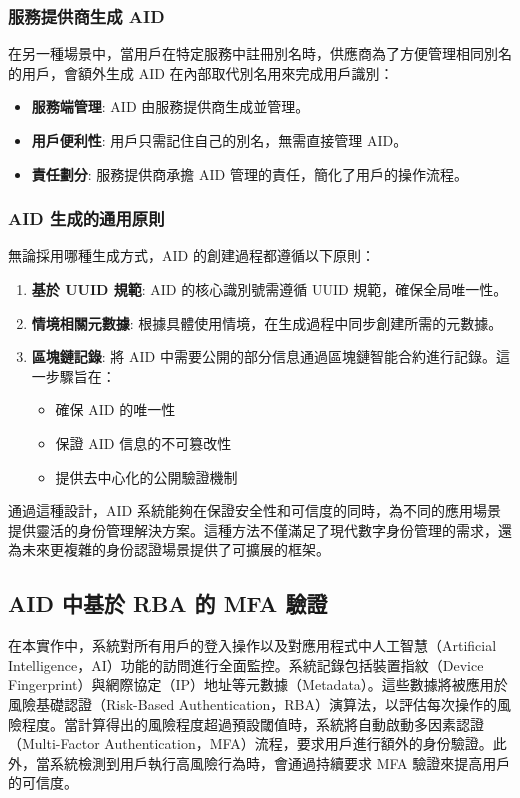 \subsubsection{服務提供商生成 AID}

在另一種場景中，當用戶在特定服務中註冊別名時，供應商為了方便管理相同別名的用戶，會額外生成 AID 在內部取代別名用來完成用戶識別：

\begin{itemize}
  \item \textbf{服務端管理}: AID 由服務提供商生成並管理。
  \item \textbf{用戶便利性}: 用戶只需記住自己的別名，無需直接管理 AID。
  \item \textbf{責任劃分}: 服務提供商承擔 AID 管理的責任，簡化了用戶的操作流程。
\end{itemize}

\subsubsection{AID 生成的通用原則}

無論採用哪種生成方式，AID 的創建過程都遵循以下原則：

\begin{enumerate}
  \item \textbf{基於 UUID 規範}: AID 的核心識別號需遵循 UUID 規範，確保全局唯一性。
  \item \textbf{情境相關元數據}: 根據具體使用情境，在生成過程中同步創建所需的元數據。
  \item \textbf{區塊鏈記錄}: 將 AID 中需要公開的部分信息通過區塊鏈智能合約進行記錄。這一步驟旨在：
        \begin{itemize}
          \item 確保 AID 的唯一性
          \item 保證 AID 信息的不可篡改性
          \item 提供去中心化的公開驗證機制
        \end{itemize}
\end{enumerate}

通過這種設計，AID 系統能夠在保證安全性和可信度的同時，為不同的應用場景提供靈活的身份管理解決方案。這種方法不僅滿足了現代數字身份管理的需求，還為未來更複雜的身份認證場景提供了可擴展的框架。

\subsection{AID 中基於 RBA 的 MFA 驗證}

在本實作中，系統對所有用戶的登入操作以及對應用程式中人工智慧（Artificial Intelligence，AI）功能的訪問進行全面監控。系統記錄包括裝置指紋（Device Fingerprint）與網際協定（IP）地址等元數據（Metadata）。這些數據將被應用於風險基礎認證（Risk-Based Authentication，RBA）演算法，以評估每次操作的風險程度。當計算得出的風險程度超過預設閾值時，系統將自動啟動多因素認證（Multi-Factor Authentication，MFA）流程，要求用戶進行額外的身份驗證。此外，當系統檢測到用戶執行高風險行為時，會通過持續要求 MFA 驗證來提高用戶的可信度。

